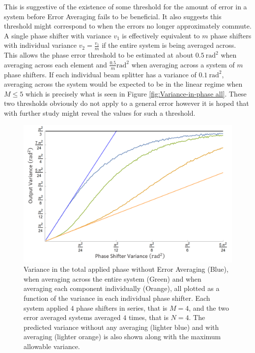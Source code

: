 \documentclass[aps,pra,twocolumn,superscriptaddress,numerical,floatfix]{revtex4-1}
\begin{document}
This is suggestive of the existence of some threshold for the amount of error in a system before Error Averaging fails to be beneficial. It also suggests this threshold might correspond to when the errors no longer approximately commute. A single phase shifter with variance $v_{1}$ is effectively equivalent to $m$ phase shifters with individual variance $v_{2}=\frac{v_{1}}{m}$ if the entire system is being averaged across. This allows the phase error threshold to be estimated at about $0.5\ \textrm{rad}^{2}$ when averaging across each element and $\frac{0.5}{m}\textrm{rad}^{2}$ when averaging across a system of $m$ phase shifters. If each individual beam splitter has a variance of $0.1\ \textrm{rad}^{2}$, averaging across the system would be expected to be in the linear regime when $M\le5$ which is precisely what is seen in Figure \ref{fig:Variance-in-phase all}. These two thresholds obviously do not apply to a general error however it is hoped that with further study might reveal the values for such a threshold.
\begin{figure}
\centerline{\includegraphics[width=\columnwidth]{variance(variance).png}}
\caption{Variance in the total applied phase without Error Averaging (Blue), when averaging across the entire system (Green) and when averaging each component individually (Orange), all plotted as a function of the variance in each individual phase shifter. Each system applied $4$ phase shifters in series, that is $M=4$, and the two error averaged systems averaged $4$ times, that is $N=4$. The predicted variance without any averaging (lighter blue) and with averaging (lighter orange) is also shown along with the maximum allowable variance. \label{fig:Variance(veriance)}}
\end{figure}
\end{document}
